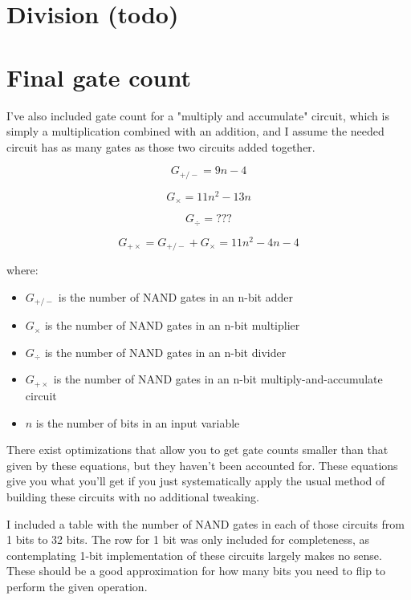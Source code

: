 \documentclass[a4paper]{article}
\begin{document}
	\pagebreak
	
	\section{Division (todo)}
	
	\pagebreak
	
	\section{Final gate count}
	
	I've also included gate count for a "multiply and accumulate" circuit, which is simply a multiplication combined with an addition, and I assume the needed circuit has as many gates as those two circuits added together.
	
	$$ G_{+/-} = 9n - 4 $$
	
	$$ G_{\times} = 11n^2 - 13n $$
	
	$$ G_{\div} = ??? $$
	
	$$ G_{+\times} = G_{+/-} + G_{\times} = 11n^2 - 4n - 4$$
	
	where:
	
	\begin{itemize}
		\item $G_{+/-}$ is the number of NAND gates in an n-bit adder
		
		\item $G_{\times}$ is the number of NAND gates in an n-bit multiplier
		
		\item $G_{\div}$ is the number of NAND gates in an n-bit divider
		
		\item $G_{+\times}$ is the number of NAND gates in an n-bit multiply-and-accumulate circuit
		
		\item $n$ is the number of bits in an input variable
	\end{itemize}
	
	There exist optimizations that allow you to get gate counts smaller than that given by these equations, but they haven't been accounted for. These equations give you what you'll get if you just systematically apply the usual method of building these circuits with no additional tweaking.
	
	\bigskip
	
	I included a table with the number of NAND gates in each of those circuits from 1 bits to 32 bits. The row for 1 bit was only included for completeness, as contemplating 1-bit implementation of these circuits largely makes no sense. These should be a good approximation for how many bits you need to flip to perform the given operation.
	
\end{document}
